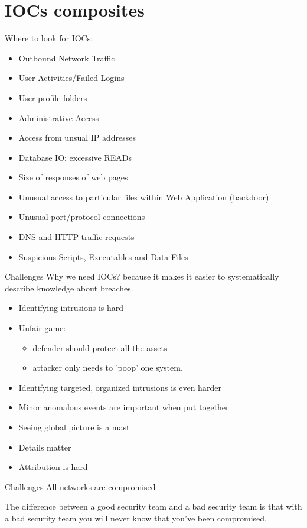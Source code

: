 \documentclass[presentation,smaller]{beamer}
\begin{document}
\section{IOCs composites}
\label{sec-5}
\begin{frame}[label=sec-5-1]{Where to look for IOCs:}
\begin{itemize}
\item Outbound Network Traffic
\item User Activities/Failed Logins
\item User profile folders
\item Administrative Access
\item Access from unsual IP addresses
\item Database IO: excessive READs
\item Size of responses of web pages
\item Unusual access to particular files within Web Application (backdoor)
\item Unusual port/protocol connections
\item DNS and HTTP traffic requests
\item Suspicious Scripts, Executables and Data Files
\end{itemize}
\end{frame}
\begin{frame}[label=sec-5-2]{Challenges}
Why we need IOCs? because it makes it easier to
systematically describe knowledge about breaches.

\begin{itemize}
\item Identifying intrusions is hard
\item Unfair game:
\begin{itemize}
\item defender should protect all the assets
\item attacker only needs to 'poop' one system.
\end{itemize}
\item Identifying targeted, organized intrusions is even harder
\item Minor anomalous events are important when put together
\item Seeing global picture is a mast
\item Details matter
\item Attribution is hard
\end{itemize}
\end{frame}
\begin{frame}[label=sec-5-3]{Challenges}
\alert{All networks are compromised}


The difference between a good security team and a bad security team is
that with a bad security team you will never know that you've been
compromised.
\end{frame}
\end{document}
